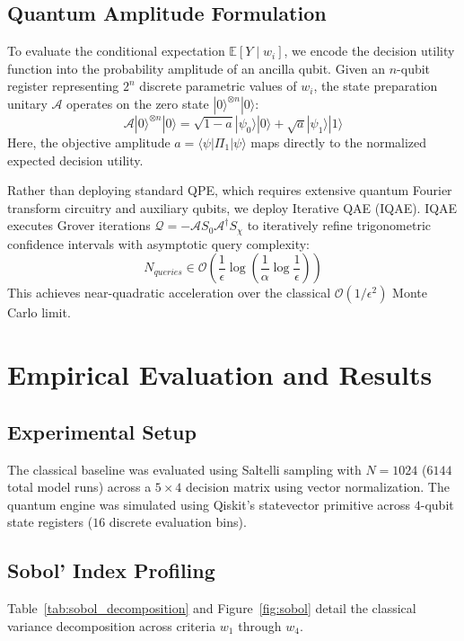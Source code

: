 \documentclass[journal]{IEEEtran}
\begin{document}
\subsection{Quantum Amplitude Formulation}
To evaluate the conditional expectation $\mathbb{E}[Y \mid w_i]$, we encode the decision utility function into the probability amplitude of an ancilla qubit. Given an $n$-qubit register representing $2^n$ discrete parametric values of $w_i$, the state preparation unitary $\mathcal{A}$ operates on the zero state $|0\rangle^{\otimes n}|0\rangle$:
\begin{equation}
\mathcal{A}|0\rangle^{\otimes n}|0\rangle = \sqrt{1 - a}|\psi_0\rangle|0\rangle + \sqrt{a}|\psi_1\rangle|1\rangle
\end{equation}
Here, the objective amplitude $a = \langle \psi | \Pi_1 | \psi \rangle$ maps directly to the normalized expected decision utility. 

Rather than deploying standard QPE, which requires extensive quantum Fourier transform circuitry and auxiliary qubits, we deploy Iterative QAE (IQAE). IQAE executes Grover iterations $\mathcal{Q} = -\mathcal{A}S_0\mathcal{A}^\dagger S_\chi$ to iteratively refine trigonometric confidence intervals with asymptotic query complexity:
\begin{equation}
N_{queries} \in \mathcal{O}\left(\frac{1}{\epsilon} \log\left(\frac{1}{\alpha}\log\frac{1}{\epsilon}\right)\right)
\end{equation}
This achieves near-quadratic acceleration over the classical $\mathcal{O}(1/\epsilon^2)$ Monte Carlo limit.

\section{Empirical Evaluation and Results}
\subsection{Experimental Setup}
The classical baseline was evaluated using Saltelli sampling with $N=1024$ ($6144$ total model runs) across a $5 \times 4$ decision matrix using vector normalization. The quantum engine was simulated using Qiskit's statevector primitive across $4$-qubit state registers ($16$ discrete evaluation bins).

\subsection{Sobol' Index Profiling}
Table~\ref{tab:sobol_decomposition} and Figure~\ref{fig:sobol} detail the classical variance decomposition across criteria $w_1$ through $w_4$.
\end{document}
